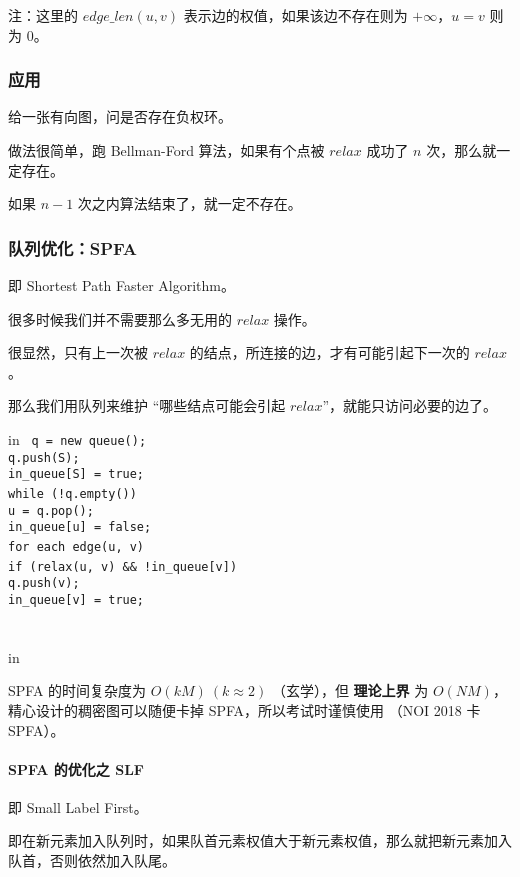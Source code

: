 注：这里的 $edge\_len(u, v)$ 表示边的权值，如果该边不存在则为 $+\infty$，$u=v$ 则为 $0$。

\subsubsection{应用}

给一张有向图，问是否存在负权环。

做法很简单，跑 Bellman-Ford 算法，如果有个点被 $relax$ 成功了 $n$ 次，那么就一定存在。

如果 $n-1$ 次之内算法结束了，就一定不存在。

\subsubsection{队列优化：SPFA}

即 Shortest Path Faster Algorithm。

很多时候我们并不需要那么多无用的 $relax$ 操作。

很显然，只有上一次被 $relax$ 的结点，所连接的边，才有可能引起下一次的 $relax$。

那么我们用队列来维护 “哪些结点可能会引起 $relax$”，就能只访问必要的边了。

 in
\texttt{
q = new queue();\\q.push(S);\\in_queue[S] = true;\\while (!q.empty()) {\\	u = q.pop();\\	in_queue[u] = false;\\	for each edge(u, v) {\\		if (relax(u, v) && !in_queue[v]) {\\			q.push(v);\\			in_queue[v] = true;\\		}\\	}\\}}
 in

SPFA 的时间复杂度为 $O(kM)~ (k\approx 2)$ （玄学），但 \textbf{理论上界} 为 $O(NM)$，精心设计的稠密图可以随便卡掉 SPFA，所以考试时谨慎使用  （NOI 2018 卡 SPFA）。

\paragraph{SPFA 的优化之 SLF}

即 Small Label First。

即在新元素加入队列时，如果队首元素权值大于新元素权值，那么就把新元素加入队首，否则依然加入队尾。

